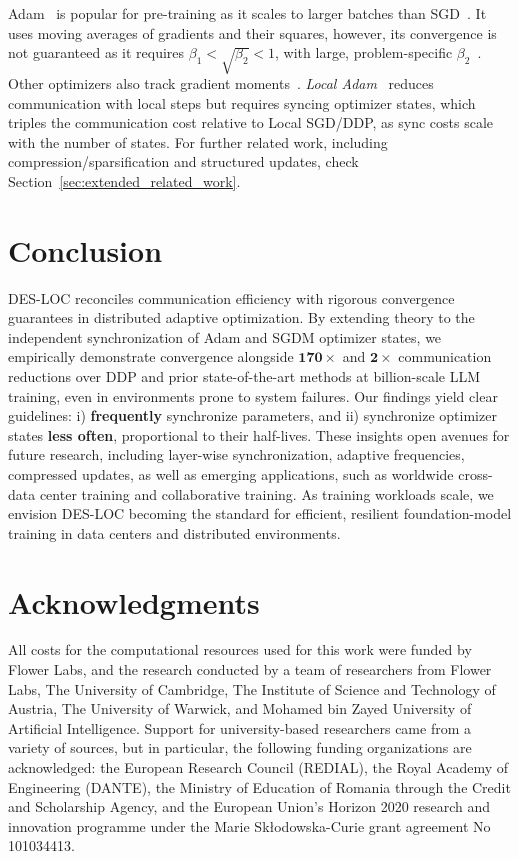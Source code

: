\documentclass{article}
\begin{document}
Adam~\citep{kingma2015adam} is popular for pre-training as it scales to larger batches than SGD~\citep{kunstner2023noise,dubey2024llama}. It uses moving averages of gradients and their squares, however,
its convergence is not guaranteed as it requires $\beta_1 < \sqrt{\beta_2} < 1$, with large, problem-specific $\beta_2$~\citep{reddi2018convergence,zhang2022adam}. Other optimizers also track gradient moments~\citep{sutskever2013importance,chen2023symbolic,you2020large,taniguchi2024improved}. \textit{Local Adam}~\citep{cheng2025convergence} reduces communication with local steps but requires syncing optimizer states, which triples the
communication cost relative to Local SGD/DDP, as sync costs scale with the number of states. For
further related work, including compression/sparsification and structured updates, check Section~\ref{sec:extended_related_work}.

\section{Conclusion}
\label{sec:conclusion}

DES-LOC reconciles communication efficiency with rigorous convergence guarantees in distributed
adaptive optimization. By extending theory to the independent synchronization of Adam and SGDM
optimizer states, we empirically demonstrate convergence alongside $\mathbf{170\times}$ and $\mathbf{2\times}$ communication
reductions over DDP and prior state-of-the-art methods at billion-scale LLM training, even in environments prone to system failures. Our findings yield clear guidelines: i) \textbf{frequently} synchronize
parameters, and ii) synchronize optimizer states \textbf{less often}, proportional to their half-lives. These
insights open avenues for future research, including layer-wise synchronization, adaptive frequencies,
compressed updates, as well as emerging applications, such as worldwide cross-data center training
and collaborative training. As training workloads scale, we envision DES-LOC becoming the standard
for efficient, resilient foundation-model training in data centers and distributed environments.

\section*{Acknowledgments}
All costs for the computational resources used for this work were funded by Flower Labs, and the
research conducted by a team of researchers from Flower Labs, The University of Cambridge, The
Institute of Science and Technology of Austria, The University of Warwick, and Mohamed bin
Zayed University of Artificial Intelligence. Support for university-based researchers came from
a variety of sources, but in particular, the following funding organizations are acknowledged: the
European Research Council (REDIAL), the Royal Academy of Engineering (DANTE), the Ministry of
Education of Romania through the Credit and Scholarship Agency, and the European Union's Horizon
2020 research and innovation programme under the Marie Sk\l{}odowska-Curie grant agreement No
101034413.
\end{document}
